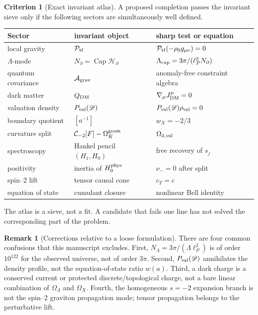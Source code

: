\documentclass[aps,prd,reprint,nofootinbib,superscriptaddress]{revtex4-2}
\numberwithin{equation}{section}
\theoremstyle{definition}
\newtheorem{criterion}{Criterion}[section]
\newtheorem{remark}{Remark}[section]
\theoremstyle{plain}
\newcommand{\Dil}{\mathscr D}
\newcommand{\Agrav}{\mathcal A_{\rm grav}}
\newcommand{\Ncap}{N_{\partial}}
\newcommand{\Capacity}{\operatorname{Cap}}
\newcommand{\Ptr}{\mathcal P_{\rm tf}}
\begin{document}
\begin{criterion}[Exact invariant atlas]\label{crit:atlas}
A proposed completion passes the invariant sieve only if the following sectors are simultaneously well defined.
\begin{center}
\footnotesize
\setlength{\tabcolsep}{2pt}
\begin{tabular}{@{}p{}p{}p{}@{}}
\toprule
Sector & invariant object & sharp test or equation\\
\midrule
local gravity & \(\Ptr\) & \(\Ptr(-\rho_0g_{\mu\nu})=0\)\\
\(\Lambda\)-mode & \(\Ncap=\Capacity\mathcal H_\partial\) & \(\Lambda_{\rm cap}=3\pi/(\ell_P^2\Ncap)\)\\
quantum covariance & \(\Agrav\) & anomaly-free constraint algebra\\
dark matter & \(Q_{\rm DM}\) & \(\nabla_\mu J^\mu_{\rm DM}=0\)\\
valuation density & \(P_{\rm val}(\Dil)\) & \(P_{\rm val}(\Dil)\rho_{\rm val}=0\)\\
boundary quotient & \([a^{-1}]\) & \(w_X=-2/3\)\\
curvature split & \(\mathcal C_{-2}[F]-\Omega_K^{\rm geom}\) & \(\Omega_{2,\rm val}\)\\
spectroscopy & Hankel pencil \((H_1,H_0)\) & free recovery of \(s_j\)\\
positivity & inertia of \(H_0^{\rm phys}\) & \(\nu_-=0\) after split\\
spin--2 lift & tensor causal cone & \(c_T=c\)\\
equation of state & cumulant closure & nonlinear Bell identity\\
\bottomrule
\end{tabular}
\end{center}
The atlas is a sieve, not a fit.  A candidate that fails one line has not solved the corresponding part of the problem.
\end{criterion}

\begin{remark}[Corrections relative to a loose formulation]
There are four common confusions that this manuscript excludes.  First, \(N_\Lambda=3\pi/(\Lambda\ell_P^2)\) is of order \(10^{122}\) for the observed universe, not of order \(3\pi\).  Second, \(P_{\rm val}(\Dil)\) annihilates the density profile, not the equation-of-state ratio \(w(a)\).  Third, a dark charge is a conserved current or protected discrete/topological charge, not a bare linear combination of \(\Omega_\Lambda\) and \(\Omega_X\).  Fourth, the homogeneous \(s=-2\) expansion branch is not the spin--2 graviton propagation mode; tensor propagation belongs to the perturbative lift.
\end{remark}
\end{document}
